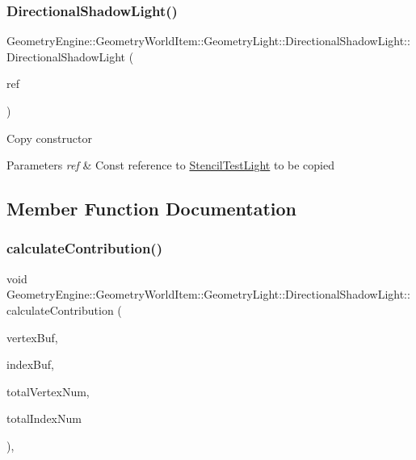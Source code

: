 \subsubsection{\texorpdfstring{DirectionalShadowLight()}{DirectionalShadowLight()}\hspace{0.1cm}{\footnotesize\ttfamily [2/2]}}
{\footnotesize\ttfamily Geometry\+Engine\+::\+Geometry\+World\+Item\+::\+Geometry\+Light\+::\+Directional\+Shadow\+Light\+::\+Directional\+Shadow\+Light (\begin{DoxyParamCaption}\item[{const \mbox{\hyperlink{class_geometry_engine_1_1_geometry_world_item_1_1_geometry_light_1_1_directional_shadow_light}{Directional\+Shadow\+Light}} \&}]{ref }\end{DoxyParamCaption})\hspace{0.3cm}{\ttfamily [inline]}}

Copy constructor 
\begin{DoxyParams}{Parameters}
{\em ref} & Const reference to \mbox{\hyperlink{class_geometry_engine_1_1_geometry_world_item_1_1_geometry_light_1_1_stencil_test_light}{Stencil\+Test\+Light}} to be copied \\
\hline
\end{DoxyParams}


\subsection{Member Function Documentation}
\mbox{\label{class_geometry_engine_1_1_geometry_world_item_1_1_geometry_light_1_1_directional_shadow_light_a712d0b0a0573ebd246a4a8aa6b2b667a}} 
\subsubsection{\texorpdfstring{calculateContribution()}{calculateContribution()}}
{\footnotesize\ttfamily void Geometry\+Engine\+::\+Geometry\+World\+Item\+::\+Geometry\+Light\+::\+Directional\+Shadow\+Light\+::calculate\+Contribution (\begin{DoxyParamCaption}\item[{Q\+Open\+G\+L\+Buffer $\ast$}]{vertex\+Buf,  }\item[{Q\+Open\+G\+L\+Buffer $\ast$}]{index\+Buf,  }\item[{unsigned int}]{total\+Vertex\+Num,  }\item[{unsigned int}]{total\+Index\+Num }\end{DoxyParamCaption})\hspace{0.3cm}{\ttfamily [protected]}, {\ttfamily [virtual]}}

